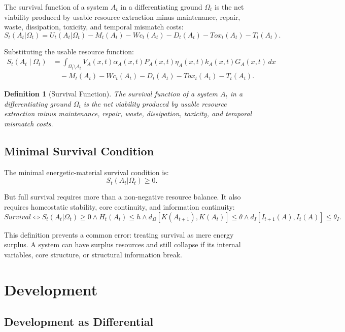 \documentclass[11pt,a4paper]{article}
\newtheorem{definition}{Definition}
\begin{document}
The survival function of a system $A_t$ in a differentiating ground $\Omega_t$ is the net viability produced by usable resource extraction minus maintenance, repair, waste, dissipation, toxicity, and temporal mismatch costs:
\[
S_t(A_t|\Omega_t)
=
U_t(A_t|\Omega_t)
- M_t(A_t)
- Wc_t(A_t)
- D_t(A_t)
- Tox_t(A_t)
- T_t(A_t).
\]

Substituting the usable resource function:
\[
\begin{aligned}
S_t(A_t\mid\Omega_t)
&= \int_{\Omega_t\setminus A_t}
V_A(x,t)\alpha_A(x,t)P_A(x,t)\eta_A(x,t)k_A(x,t)G_A(x,t)\,dx\\
&\quad - M_t(A_t) - Wc_t(A_t) - D_t(A_t) - Tox_t(A_t) - T_t(A_t).
\end{aligned}
\]

\begin{definition}[Survival Function]
The survival function of a system $A_t$ in a differentiating ground $\Omega_t$ is the net viability produced by usable resource extraction minus maintenance, repair, waste, dissipation, toxicity, and temporal mismatch costs.
\end{definition}

\subsection{Minimal Survival Condition}

The minimal energetic-material survival condition is:
\[
S_t(A_t|\Omega_t)\geq0.
\]

But full survival requires more than a non-negative resource balance. It also requires homeostatic stability, core continuity, and information continuity:
\[
Survival
\Longleftrightarrow
S_t(A_t|\Omega_t)\geq0
\wedge
H_t(A_t)\leq h
\wedge
d_{\Omega}[K(A_{t+1}),K(A_t)]\leq\theta
\wedge
d_I[I_{t+1}(A),I_t(A)]\leq\theta_I.
\]

This definition prevents a common error: treating survival as mere energy surplus. A system can have surplus resources and still collapse if its internal variables, core structure, or structural information break.

\section{Development}

\subsection{Development as Differential}
\end{document}
